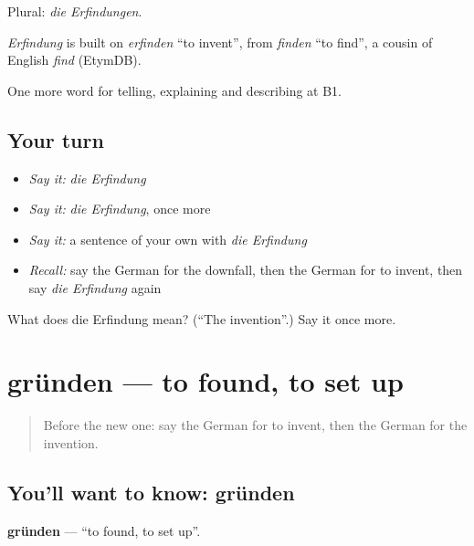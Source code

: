 Plural: \emph{die Erfindungen}.

\begin{cousinweb}
\emph{Erfindung} is built on \emph{erfinden} \textquotedblleft{}to invent\textquotedblright{}, from \emph{finden} \textquotedblleft{}to find\textquotedblright{}, a cousin of English \emph{find} (EtymDB).
\end{cousinweb}

\begin{grammarlens}[title={What you've built}]
One more word for telling, explaining and describing at B1.
\end{grammarlens}

\subsection*{Your turn}
\begin{itemize}
\raggedright
  \item \emph{Say it:} \emph{die Erfindung}
  \item \emph{Say it:} \emph{die Erfindung}, once more
  \item \emph{Say it:} a sentence of your own with \emph{die Erfindung}
  \item \emph{Recall:} say the German for the downfall, then the German for to invent, then say \emph{die Erfindung} again
\end{itemize}

\begin{tcolorbox}[breakable,colback=teal!4,colframe=teal!35!black,title={Before you move on}]
What does die Erfindung mean? (\textquotedblleft{}The invention\textquotedblright{}.) Say it once more.
\end{tcolorbox}
\section[gründen]{gründen — to found, to set up}

\label{lesson:GE-C321-gruenden}



\begin{quote}
Before the new one: say the German for to invent, then the German for the invention.
\end{quote}

\subsection*{You'll want to know: gründen}
\textbf{gründen} — \textquotedblleft{}to found, to set up\textquotedblright{}.

